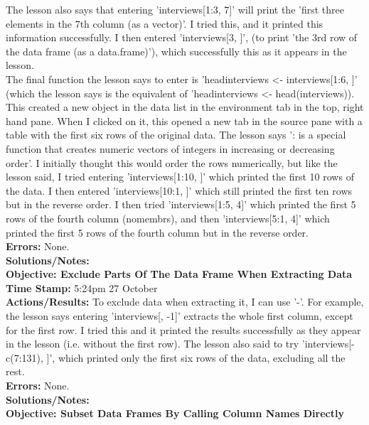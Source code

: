 \documentclass{article}
\begin{document}
\begin{FlushLeft}
The lesson also says that entering 'interviews[1:3, 7]' will print the 'first three elements in the 7th column (as a vector)'. I tried this, and it printed this information successfully. I then entered 'interviews[3, ]', (to print 'the 3rd row of the data frame (as a data.frame)'), which successfully this as it appears in the lesson.\\
The final function the lesson says to enter is 'head\textunderscore interviews <- interviews[1:6, ]' (which the lesson says is the equivalent of 'head\textunderscore interviews \textless - head(interviews)). This created a new object in the data list in the environment tab in the top, right hand pane. When I clicked on it, this opened a new tab in the source pane with a table with the first six rows of the original data. The lesson says ': is a special function that creates numeric vectors of integers in increasing or decreasing order'. I initially thought this would order the rows numerically, but like the lesson said, I tried entering 'interviews[1:10, ]' which printed the first 10 rows of the data. I then entered 'interviews[10:1, ]' which still printed the first ten rows but in the reverse order. I then tried 'interviews[1:5, 4]' which printed the first 5 rows of the fourth column (no\textunderscore membrs), and then 'interviews[5:1, 4]' which printed the first 5 rows of the fourth column but in the reverse order.\\
\textbf{Errors:} None.\\
\textbf{Solutions/Notes:}\\
\vspace{5mm}
\textbf{Objective: Exclude Parts Of The Data Frame When Extracting Data}\\ 
\textbf{Time Stamp:} 5:24pm 27 October\\
\textbf{Actions/Results:} To exclude data when extracting it, I can use '-'. For example, the lesson says entering 'interviews[, -1]' extracts the whole first column, except for the first row. I tried this and it printed the results successfully as they appear in the lesson (i.e. without the first row). The lesson also said to try 'interviews[-c(7:131), ]', which printed only the first six rows of the data, excluding all the rest.\\
\textbf{Errors:} None.\\
\textbf{Solutions/Notes:}\\
\vspace{5mm}
\textbf{Objective: Subset Data Frames By Calling Column Names Directly}\\ 

\end{FlushLeft}
\end{document}
